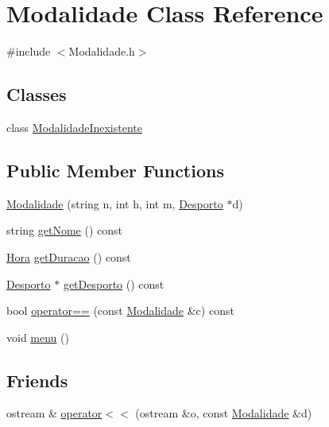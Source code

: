 \hypertarget{class_modalidade}{}\section{Modalidade Class Reference}
\label{class_modalidade}


{\ttfamily \#include $<$Modalidade.\+h$>$}

\subsection*{Classes}
\begin{DoxyCompactItemize}
\item 
class \hyperlink{class_modalidade_1_1_modalidade_inexistente}{Modalidade\+Inexistente}
\end{DoxyCompactItemize}
\subsection*{Public Member Functions}
\begin{DoxyCompactItemize}
\item 
\hyperlink{class_modalidade_ab70be2e5b2bf7a96a6e6a023f99b0c4b}{Modalidade} (string n, int h, int m, \hyperlink{class_desporto}{Desporto} $\ast$d)
\item 
string \hyperlink{class_modalidade_a46003f6a0dceac894f92971a6df9e4a7}{get\+Nome} () const 
\item 
\hyperlink{class_hora}{Hora} \hyperlink{class_modalidade_a7328b4411500160244ca64183478a5c1}{get\+Duracao} () const 
\item 
\hyperlink{class_desporto}{Desporto} $\ast$ \hyperlink{class_modalidade_ad128148792b93ca028b9cbcf73989bdd}{get\+Desporto} () const 
\item 
bool \hyperlink{class_modalidade_a502ce8cade8d9a04bc946ca5c3d6b0ca}{operator==} (const \hyperlink{class_modalidade}{Modalidade} \&c) const 
\item 
void \hyperlink{class_modalidade_a96cf31bec8dccd09e83b23d7d44925b3}{menu} ()
\end{DoxyCompactItemize}
\subsection*{Friends}
\begin{DoxyCompactItemize}
\item 
ostream \& \hyperlink{class_modalidade_a0068376dcbf60055a775ed885687e6e8}{operator$<$$<$} (ostream \&o, const \hyperlink{class_modalidade}{Modalidade} \&d)
\end{DoxyCompactItemize}


